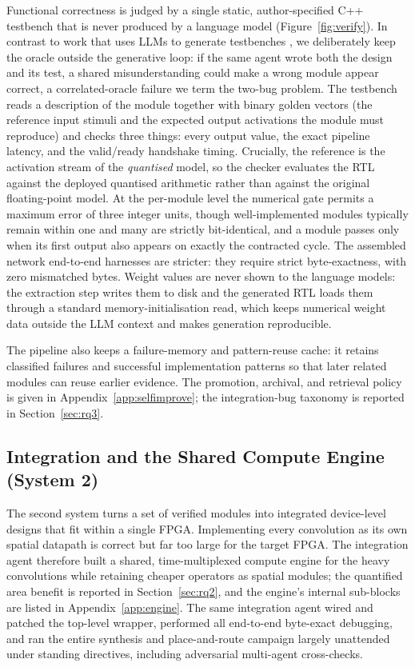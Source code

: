 \documentclass[acmtog,authorversion]{acmart}
\begin{document}
Functional correctness is judged by a single static, author-specified C++ testbench that is never produced by a language model (Figure~\ref{fig:verify}). In contrast to work that uses LLMs to generate testbenches \cite{qiu2024autobench}, we deliberately keep the oracle outside the generative loop: if the same agent wrote both the design and its test, a shared misunderstanding could make a wrong module appear correct, a correlated-oracle failure we term the two-bug problem. The testbench reads a description of the module together with binary golden vectors (the reference input stimuli and the expected output activations the module must reproduce) and checks three things: every output value, the exact pipeline latency, and the valid/ready handshake timing. Crucially, the reference is the activation stream of the \emph{quantised} model, so the checker evaluates the RTL against the deployed quantised arithmetic rather than against the original floating-point model. At the per-module level the numerical gate permits a maximum error of three integer units, though well-implemented modules typically remain within one and many are strictly bit-identical, and a module passes only when its first output also appears on exactly the contracted cycle. The assembled network end-to-end harnesses are stricter: they require strict byte-exactness, with zero mismatched bytes. Weight values are never shown to the language models: the extraction step writes them to disk and the generated RTL loads them through a standard memory-initialisation read, which keeps numerical weight data outside the LLM context and makes generation reproducible.

The pipeline also keeps a failure-memory and pattern-reuse cache: it retains classified failures and successful implementation patterns so that later related modules can reuse earlier evidence. The promotion, archival, and retrieval policy is given in Appendix~\ref{app:selfimprove}; the integration-bug taxonomy is reported in Section~\ref{sec:rq3}.

\subsection{Integration and the Shared Compute Engine (System 2)}
\label{sec:system2}

The second system turns a set of verified modules into integrated device-level designs that fit within a single FPGA. Implementing every convolution as its own spatial datapath is correct but far too large for the target FPGA. The integration agent therefore built a shared, time-multiplexed compute engine for the heavy convolutions while retaining cheaper operators as spatial modules; the quantified area benefit is reported in Section~\ref{sec:rq2}, and the engine's internal sub-blocks are listed in Appendix~\ref{app:engine}. The same integration agent wired and patched the top-level wrapper, performed all end-to-end byte-exact debugging, and ran the entire synthesis and place-and-route campaign largely unattended under standing directives, including adversarial multi-agent cross-checks.
\end{document}
